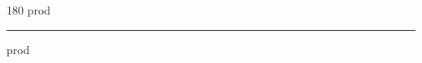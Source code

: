 
\begin{frame}
\begin{center}
\begin{turn}{180}
{\fontsize{2.5cm}{1em}\selectfont prod}
\end{turn}
\vspace{1em}\par  
\hrule
\vspace{1em}\par  
{\fontsize{2.5cm}{1em}\selectfont prod}
\end{center}
\end{frame}

